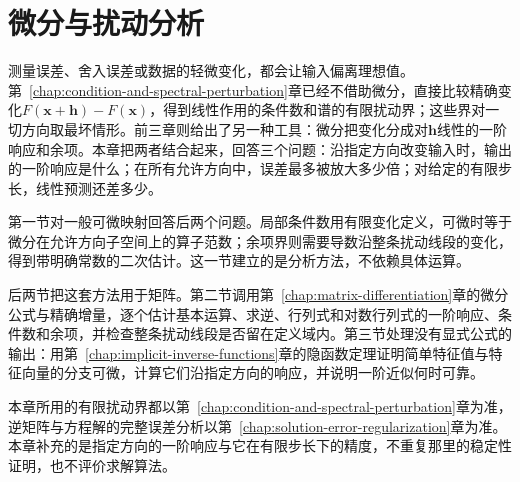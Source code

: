 \chapter{微分与扰动分析}
\label{chap:differential-perturbation-analysis}

测量误差、舍入误差或数据的轻微变化，都会让输入偏离理想值。第~\ref{chap:condition-and-spectral-perturbation}章已经不借助微分，直接比较精确变化$F(\bm x+\bm h)-F(\bm x)$，得到线性作用的条件数和谱的有限扰动界；这些界对一切方向取最坏情形。前三章则给出了另一种工具：微分把变化分成对$\bm h$线性的一阶响应和余项。本章把两者结合起来，回答三个问题：沿指定方向改变输入时，输出的一阶响应是什么；在所有允许方向中，误差最多被放大多少倍；对给定的有限步长，线性预测还差多少。

第一节对一般可微映射回答后两个问题。局部条件数用有限变化定义，可微时等于微分在允许方向子空间上的算子范数；余项界则需要导数沿整条扰动线段的变化，得到带明确常数的二次估计。这一节建立的是分析方法，不依赖具体运算。

后两节把这套方法用于矩阵。第二节调用第~\ref{chap:matrix-differentiation}章的微分公式与精确增量，逐个估计基本运算、求逆、行列式和对数行列式的一阶响应、条件数和余项，并检查整条扰动线段是否留在定义域内。第三节处理没有显式公式的输出：用第~\ref{chap:implicit-inverse-functions}章的隐函数定理证明简单特征值与特征向量的分支可微，计算它们沿指定方向的响应，并说明一阶近似何时可靠。

本章所用的有限扰动界都以第~\ref{chap:condition-and-spectral-perturbation}章为准，逆矩阵与方程解的完整误差分析以第~\ref{chap:solution-error-regularization}章为准。本章补充的是指定方向的一阶响应与它在有限步长下的精度，不重复那里的稳定性证明，也不评价求解算法。





